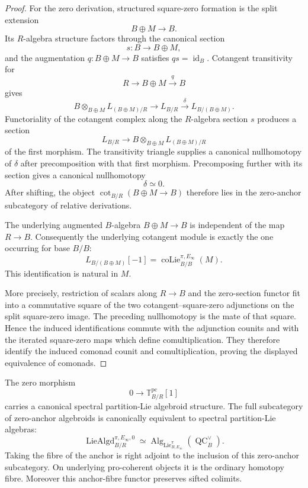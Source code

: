 \begin{proof}
For the zero derivation, structured square-zero formation is the split
extension
\[
    B\oplus M\longrightarrow B.
\]
Its $R$-algebra structure factors through the canonical section
\[
    s:B\longrightarrow B\oplus M,
\]
and the augmentation
$q:B\oplus M\to B$ satisfies $qs=\operatorname{id}_B$.  Cotangent
transitivity for
\[
    R\longrightarrow B\oplus M\xrightarrow{q}B
\]
gives
\[
    B\otimes_{B\oplus M}L_{(B\oplus M)/R}
    \longrightarrow
    L_{B/R}
    \xrightarrow{\delta}
    L_{B/(B\oplus M)}.
\]
Functoriality of the cotangent complex along the $R$-algebra section $s$
produces a section
\[
    L_{B/R}
    \longrightarrow
    B\otimes_{B\oplus M}L_{(B\oplus M)/R}
\]
of the first morphism.  The transitivity triangle supplies a canonical
nullhomotopy of $\delta$ after precomposition with that first morphism.
Precomposing further with its section gives a canonical nullhomotopy
\[
    \delta\simeq0.
\]
After shifting, the object
$\operatorname{cot}_{B/R}(B\oplus M\to B)$ therefore lies in the zero-anchor
subcategory of relative derivations.

The underlying augmented $B$-algebra
$B\oplus M\to B$ is independent of the map $R\to B$.  Consequently the
underlying cotangent module is exactly the one occurring for base $B/B$:
\[
    L_{B/(B\oplus M)}[-1]
    =
    \operatorname{coLie}^{\pi,E_\infty}_{B/B}(M).
\]
This identification is natural in $M$.

More precisely, restriction of scalars along $R\to B$ and the zero-section
functor fit into a commutative square of the two cotangent--square-zero
adjunctions on the split square-zero image.  The preceding nullhomotopy is the
mate of that square.  Hence the induced identifications commute with the
adjunction counits and with the iterated square-zero maps which define
comultiplication.  They therefore identify the induced comonad counit and
comultiplication, proving the displayed equivalence of comonads.
\end{proof}

\begin{theorem}
\label{thm:bnla-zero-anchor-spectral-algebroids}
The zero morphism
\[
    0\longrightarrow\mathbb T^{\mathrm{pc}}_{B/R}[1]
\]
carries a canonical spectral partition-Lie algebroid structure.  The full
subcategory of zero-anchor algebroids is canonically equivalent to spectral
partition-Lie algebras:
\[
\boxed{
    \operatorname{LieAlgd}^{\pi,E_\infty,0}_{B/R}
    \simeq
    \operatorname{Alg}_{\operatorname{Lie}^{\pi}_{B,E_\infty}}
    \left(\operatorname{QC}^{\vee}_B\right).}
\]
Taking the fibre of the anchor is right adjoint to the inclusion of this
zero-anchor subcategory.  On underlying pro-coherent objects it is the
ordinary homotopy fibre.  Moreover this anchor-fibre functor preserves sifted
colimits.
\end{theorem}

